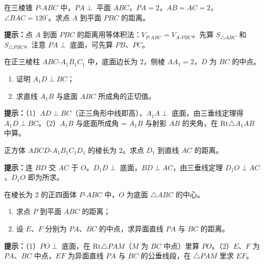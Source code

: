 \documentclass{exam-zh}
\begin{document}
\begin{problem}[points=14]
    在三棱锥 $P\text{-}ABC$ 中，$PA\perp$ 平面 $ABC$，$PA=2$，$AB=AC=2$，$\angle BAC=120^{\circ}$。求点 $A$ 到平面 $PBC$ 的距离。

    \begin{hintbox}
\textbf{提示：}点 $A$ 到面 $PBC$ 的距离用等体积法：$V_{P\text{-}ABC}=V_{A\text{-}PBC}$。先算 $S_{\triangle ABC}$ 和 $S_{\triangle PBC}$。注意 $PA\perp$ 底面，可先算 $PB$、$PC$。\end{hintbox}

  \answerarea[70mm]
\end{problem}



\begin{problem}[points=12]
    在正三棱柱 $ABC\text{-}A_1B_1C_1$ 中，底面边长为 $2$，侧棱 $AA_1=2$，$D$ 为 $BC$ 的中点。
\begin{enumerate}[label=(\arabic*)]
  \item 证明 $A_1D\perp BC$；
  \item 求直线 $A_1B$ 与底面 $ABC$ 所成角的正切值。
\end{enumerate}

    \begin{hintbox}
\textbf{提示：}（1）$AD\perp BC$（正三角形中线即高），$A_1A\perp$ 底面，由三垂线定理得 $A_1D\perp BC$。（2）$A_1B$ 与底面所成角 = $A_1B$ 与射影 $AB$ 的夹角，在 $\text{Rt}\triangle A_1AB$ 中算。\end{hintbox}

  \answerarea[62mm]
\end{problem}



\begin{problem}[points=10]
    正方体 $ABCD\text{-}A_1B_1C_1D_1$ 的棱长为 $2$。求点 $D_1$ 到直线 $AC$ 的距离。

    \begin{hintbox}
\textbf{提示：}连 $BD$ 交 $AC$ 于 $O$。$D_1D\perp$ 底面，$BD\perp AC$，由三垂线定理 $D_1O\perp AC$，$D_1O$ 即为所求。\end{hintbox}

  \answerarea[55mm]
\end{problem}



\begin{problem}[points=12]
    在棱长为 $2$ 的正四面体 $P\text{-}ABC$ 中，$O$ 为底面 $\triangle ABC$ 的中心。
\begin{enumerate}[label=(\arabic*)]
  \item 求点 $P$ 到平面 $ABC$ 的距离；
  \item 设 $E$、$F$ 分别为 $PA$、$BC$ 的中点，求异面直线 $PA$ 与 $BC$ 的距离。
\end{enumerate}

    \begin{hintbox}
\textbf{提示：}（1）$PO\perp$ 底面，在 $\text{Rt}\triangle PAM$（$M$ 为 $BC$ 中点）里算 $PO$。（2）$E$、$F$ 为 $PA$、$BC$ 中点，$EF$ 为异面直线 $PA$ 与 $BC$ 的公垂线段，在 $\triangle PAM$ 里求 $EF$。\end{hintbox}

  \answerarea[70mm]
\end{problem}
\end{document}
